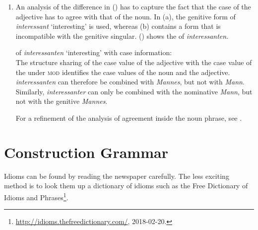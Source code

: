\begin{enumerate}
{{{{                                   } 
                           } \\
}}
\label{avm-max-lacht}
\largerpage
\item An analysis of the difference in () has to capture the fact that the case of the adjective has to agree with that of the noun. In (a),
the genitive form of \emph{interessant} `interesting' is used, whereas (b) contains a form that is incompatible with the genitive singular.
\eal
{}
\zl
() shows the \catv of \emph{interessanten}.

\eas
\catv of \emph{interessanten} `interesting' with case information:\\
\zs
The structure sharing of the case value of the adjective with the case value of the \nbar under \textsc{mod}
identifies the case values of the noun and the adjective. \emph{interessanten} can therefore be combined with 
\emph{Mannes}, but not with \emph{Mann}. Similarly, \emph{interessanter}
can only be combined with the nominative \emph{Mann}, but not with the genitive \emph{Mannes}. 

For a refinement of the analysis of agreement inside the noun phrase, see .
\end{enumerate}


\section{Construction Grammar}

Idioms can be found by reading the newspaper carefully. The less exciting method is to look them up a dictionary of
idioms such as the Free Dictionary of Idioms and Phrases\footnote{%
\url{http://idioms.thefreedictionary.com/}, 2018-02-20.
}.


